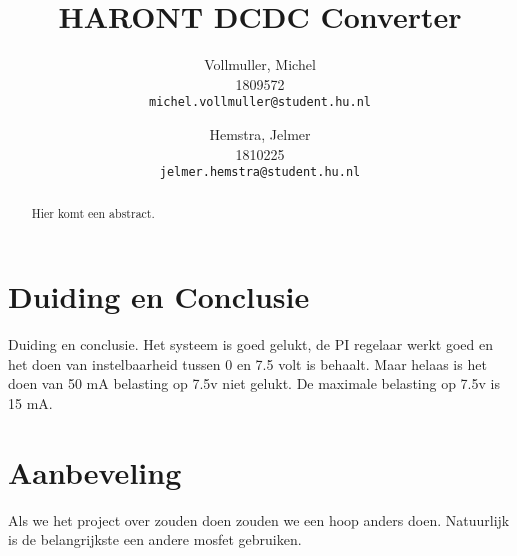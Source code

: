 \documentclass{article}
\title{HARONT DCDC Converter}
\author{
  Vollmuller, Michel\\
  1809572\\
  \texttt{michel.vollmuller@student.hu.nl}
  \and
  Hemstra, Jelmer\\
  1810225\\
  \texttt{jelmer.hemstra@student.hu.nl}
}
\begin{document}
\maketitle

\begin{abstract}
    Hier komt een abstract.
\end{abstract}










\section{Duiding en Conclusie}
Duiding en conclusie.
Het systeem is goed gelukt, de PI regelaar werkt goed en het doen van instelbaarheid tussen 0 en 7.5 volt is behaalt. 
Maar helaas is het doen van 50 mA belasting op 7.5v niet gelukt. 
De maximale belasting op 7.5v is 15 mA. 

\section{Aanbeveling}
Als we het project over zouden doen zouden we een hoop anders doen. 
Natuurlijk is de belangrijkste een andere mosfet gebruiken. 



\appendix
\end{document}
